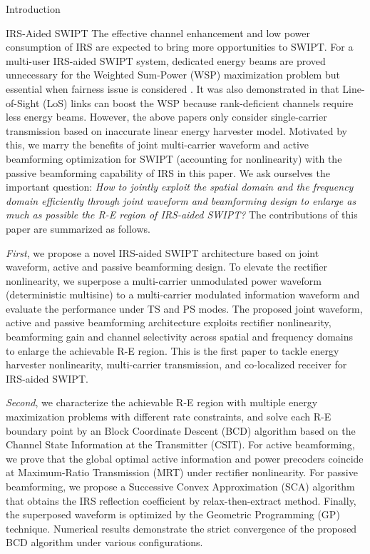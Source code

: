 \documentclass[journal]{IEEEtran}
\begin{document}
\begin{section}{Introduction}
		\begin{subsection}{IRS-Aided SWIPT}
			The effective channel enhancement and low power consumption of IRS are expected to bring more opportunities to SWIPT. For a multi-user IRS-aided SWIPT system, dedicated energy beams are proved unnecessary for the Weighted Sum-Power (WSP) maximization problem \cite{Wu2020b} but essential when fairness issue is considered \cite{Tang2019}. It was also demonstrated in \cite{Wu2020a} that Line-of-Sight (LoS) links can boost the WSP because rank-deficient channels require less energy beams. However, the above papers only consider single-carrier transmission based on inaccurate linear energy harvester model. Motivated by this, we marry the benefits of joint multi-carrier waveform and active beamforming optimization for SWIPT (accounting for nonlinearity) with the passive beamforming capability of IRS in this paper. We ask ourselves the important question: \emph{How to jointly exploit the spatial domain and the frequency domain efficiently through joint waveform and beamforming design to enlarge as much as possible the R-E region of IRS-aided SWIPT?} The contributions of this paper are summarized as follows.

			\emph{First}, we propose a novel IRS-aided SWIPT architecture based on joint waveform, active and passive beamforming design. To elevate the rectifier nonlinearity, we superpose a multi-carrier unmodulated power waveform (deterministic multisine) to a multi-carrier modulated information waveform and evaluate the performance under TS and PS modes. The proposed joint waveform, active and passive beamforming architecture exploits rectifier nonlinearity, beamforming gain and channel selectivity across spatial and frequency domains to enlarge the achievable R-E region. This is the first paper to tackle energy harvester nonlinearity, multi-carrier transmission, and co-localized receiver for IRS-aided SWIPT.

			\emph{Second}, we characterize the achievable R-E region with multiple energy maximization problems with different rate constraints, and solve each R-E boundary point by an Block Coordinate Descent (BCD) algorithm based on the Channel State Information at the Transmitter (CSIT). For active beamforming, we prove that the global optimal active information and power precoders coincide at Maximum-Ratio Transmission (MRT) under rectifier nonlinearity. For passive beamforming, we propose a Successive Convex Approximation (SCA) algorithm that obtains the IRS reflection coefficient by relax-then-extract method. Finally, the superposed waveform is optimized by the Geometric Programming (GP) technique. Numerical results demonstrate the strict convergence of the proposed BCD algorithm under various configurations.


\end{subsection}
\end{section}
\end{document}
